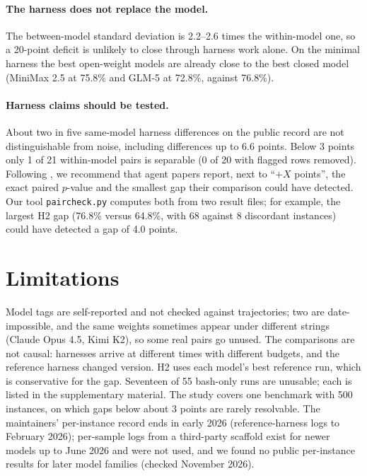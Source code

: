 \documentclass[10pt]{article}
\begin{document}
\paragraph{The harness does not replace the model.} The between-model standard deviation is 2.2--2.6 times the within-model one, so a 20-point deficit is unlikely to close through harness work alone. On the minimal harness the best open-weight models are already close to the best closed model (MiniMax 2.5 at 75.8\% and GLM-5 at 72.8\%, against 76.8\%).

\paragraph{Harness claims should be tested.} About two in five same-model harness differences on the public record are not distinguishable from noise, including differences up to 6.6 points. Below 3 points only 1 of 21 within-model pairs is separable (0 of 20 with flagged rows removed). Following \citet{card2020power}, we recommend that agent papers report, next to ``$+X$ points'', the exact paired $p$-value and the smallest gap their comparison could have detected. Our tool \texttt{paircheck.py} computes both from two result files; for example, the largest H2 gap (76.8\% versus 64.8\%, with 68 against 8 discordant instances) could have detected a gap of 4.0 points.

\section{Limitations}

Model tags are self-reported and not checked against trajectories; two are date-impossible, and the same weights sometimes appear under different strings (Claude Opus 4.5, Kimi K2), so some real pairs go unused. The comparisons are not causal: harnesses arrive at different times with different budgets, and the reference harness changed version. H2 uses each model's best reference run, which is conservative for the gap. Seventeen of 55 bash-only runs are unusable; each is listed in the supplementary material. The study covers one benchmark with 500 instances, on which gaps below about 3 points are rarely resolvable. The maintainers' per-instance record ends in early 2026 (reference-harness logs to February 2026); per-sample logs from a third-party scaffold exist for newer models up to June 2026 and were not used, and we found no public per-instance results for later model families (checked November 2026).
\end{document}
